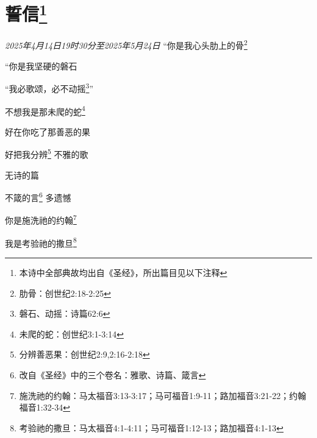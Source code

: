 \section*{誓信\footnote{本诗中全部典故均出自《圣经》，所出篇目见以下注释}}
\begin{center}
\textit{2025年4月14日19时30分至2025年5月24日}\hh 
“你是我心头肋上的骨\footnote{肋骨：创世纪2:18-2:25}

“你是我坚硬的磐石

“我必歌颂，必不动摇\footnote{磐石、动摇：诗篇62:6}”\hh

不想我是那未爬的蛇\footnote{未爬的蛇：创世纪3:1-3:14}

好在你吃了那善恶的果

好把我分辨\footnote{分辨善恶果：创世纪2:9,2:16-2:18}\hh
不雅的歌

无诗的篇

不箴的言\footnote{改自《圣经》中的三个卷名：雅歌、诗篇、箴言}\hh
多遗憾

你是施洗祂的约翰\footnote{施洗祂的约翰：马太福音3:13-3:17；马可福音1:9-11；路加福音3:21-22；约翰福音1:32-34}

我是考验祂的撒旦\footnote{考验祂的撒旦：马太福音4:1-4:11；马可福音1:12-13；路加福音4:1-13}
\end{center}